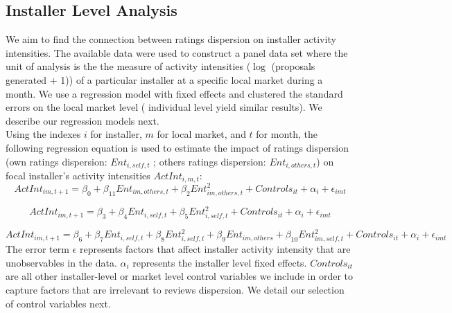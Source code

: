 \documentclass[msom,blindrev]{informs3}
\begin{document}
\subsection{Installer Level Analysis}
We aim to find the connection between ratings dispersion on installer activity intensities. The available data were used to construct a panel data set where the unit of analysis is the the measure of activity intensities ($\log$ (proposals generated + 1)) of a particular installer at a specific local market during a month. We use a regression model with fixed effects and clustered the standard errors on the local market level ( individual level yield similar results). We describe our regression models next. \\
Using the indexes $i$ for installer, $m$ for local market, and $t$ for month, the following regression equation is used to estimate the impact of ratings dispersion (own ratings dispersion: $Ent_{i,self,t}$ ; others ratings dispersion: $Ent_{i,others,t}$) on focal installer's activity intensities $ActInt_{i,m,t}$: 
\begin{equation}
    ActInt_{im,t+1}=\beta_{0}+\beta_{11} Ent_{im,others,t}+\beta_{2}Ent_{im,others,t}^2+  
   Controls_{it}+\alpha_{i}+\epsilon_{imt}
   \label{model_ind_1}
\end{equation}

\begin{equation}
    ActInt_{im,t+1}=\beta_{3}+\beta_{4} Ent_{i,self,t}+\beta_{5}Ent_{i,self,t}^2+  
   Controls_{it}+\alpha_{i}+\epsilon_{imt} 
   \label{model_ind_2}
\end{equation}

\begin{equation}
    ActInt_{im,t+1}=\beta_{6}+\beta_{7}Ent_{i,self,t}+\beta_{8}Ent_{i,self,t}^2+\beta_{9}Ent_{im,others}+\beta_{10}Ent_{im,self,t}^2+Controls_{it}+\alpha_{i}+\epsilon_{imt} 
   \label{model_ind_3}
\end{equation}
 The error term $\epsilon$ represents factors that affect installer activity intensity that are unobservables in the data. $\alpha_{i}$ represents the installer level fixed effects. $Controls_{it}$ are all other installer-level or market level control variables we include in order to capture factors that are irrelevant to reviews dispersion. We detail our selection of control variables next. 
\end{document}
